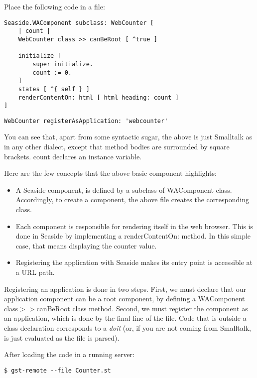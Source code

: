 \documentclass[a4paper,10pt,twoside]{book}
\newcommand{\ct}[1]{{\small\ttfamily\textup{#1}}}
\begin{document}
Place the following code in a file:

\begin{lstlisting}
Seaside.WAComponent subclass: WebCounter [
    | count |
    WebCounter class >> canBeRoot [ ^true ]

    initialize [
        super initialize.
        count := 0.
    ]
    states [ ^{ self } ]
    renderContentOn: html [ html heading: count ]
]
\end{lstlisting}

\begin{lstlisting}
WebCounter registerAsApplication: 'webcounter'
\end{lstlisting}

You can see that, apart from some syntactic sugar, the above is just Smalltalk as in any other dialect, except that method bodies are surrounded by square brackets. \ct{count} declares an instance variable.

Here are the few concepts that the above basic component highlights:

\begin{itemize}
\item  A Seaside component, is defined by a subclass of \ct{WAComponent} class. Accordingly, to create a component, the above file creates the corresponding class.
\item  Each component is responsible for rendering itself in the web browser. This is done in Seaside by implementing a \ct{renderContentOn:} method. In this simple case, that means displaying the counter value.
\item  Registering the application with Seaside makes its entry point is accessible at a URL path.
\end{itemize}

Registering an application is done in two steps. First, we must declare that our application component can be a root component, by defining a \ct{WAComponent class$>$$>$canBeRoot} class method. Second, we must register the component as an application, which is done by the final line of the file. Code that is outside a class declaration corresponds to a \textit{doit} (or, if you are not coming from Smalltalk, is just evaluated as the file is parsed).

After loading the code in a running server:

\begin{lstlisting}
$ gst-remote --file Counter.st
\end{lstlisting}
\end{document}
